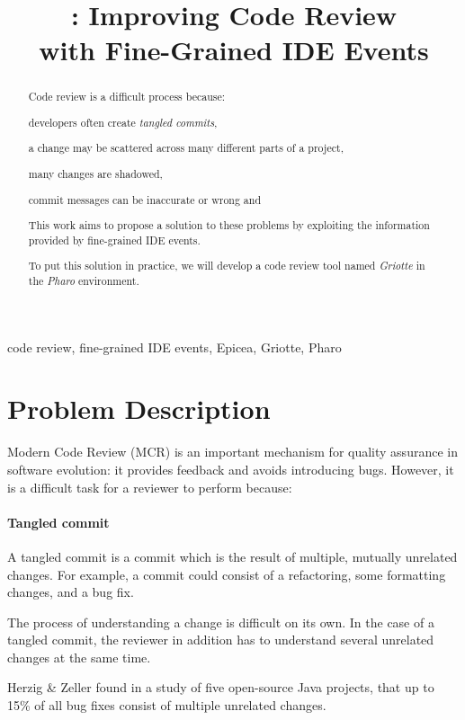 \documentclass[conference,a4paper]{IEEEtran}
\title{\Gr{}: Improving Code Review\\with Fine-Grained IDE Events}
\author{\IEEEauthorblockN{Skip~Lentz}\IEEEauthorblockA{EEMCS\\Delft
    University of Technology} \and
  \IEEEauthorblockN{Mart\'{i}n~Dias}\IEEEauthorblockA{RMoD\\INRIA
    Lille-Nord Europe}}
\newcommand{\TC}{tangled commit}
\newcommand{\Ep}{Epicea}
\newcommand{\Gr}{Griotte}
\begin{document}
\maketitle{}
\begin{abstract}
  Code review is a difficult process because:
  \begin{enumerate*}[label=(\arabic*)]
  \item developers often create \textit{tangled commits},
  \item a change may be scattered across many different parts of a
    project,
  \item many changes are shadowed,
  \item commit messages can be inaccurate or wrong and
  \end{enumerate*}

  This work aims to propose a solution to these problems by exploiting
  the information provided by fine-grained IDE events.

  To put this solution in practice, we will develop a code review tool
  named \textit{\Gr} in the \textit{Pharo} environment.
\end{abstract}
\begin{IEEEkeywords}
  code review, fine-grained IDE events, \Ep, \Gr, Pharo
\end{IEEEkeywords}

\section{Problem Description}
\label{sec:problem-description}
Modern Code Review (MCR) is an important mechanism for quality
assurance in software evolution: it provides feedback and avoids
introducing bugs. However, it is a difficult task for a reviewer to
perform because:

\paragraph{Tangled commit}

A \TC{} is a commit which is the result of multiple, mutually
unrelated changes. For example, a commit could consist of a
refactoring, some formatting changes, and a bug fix.

The process of understanding a change is difficult on its own. In the
case of a tangled commit, the reviewer in addition has to understand
several unrelated changes at the same time.

Herzig \& Zeller found in a study of five open-source Java projects,
that up to 15\% of all bug fixes consist of multiple unrelated
changes\cite{Herz11a}.
\end{document}
